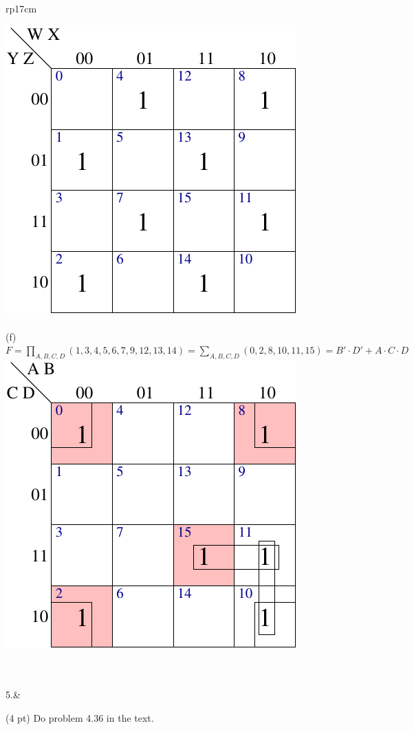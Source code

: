 \documentclass{article}
\begin{document}
\begin{longtable}[l]{rp{17cm}}
\begin{minipage}[t]{\linewidth}
\includegraphics{../CombinationalCircuits/Assessments/wakerly_4_15_e}\\ \\
(f)\\
$F=\prod_{A,B,C,D}(1,3,4,5,6,7,9,12,13,14)=\sum_{A,B,C,D}(0,2,8,10,11,15)=B' \cdot D' + A \cdot C \cdot D$\\
\includegraphics{../CombinationalCircuits/Assessments/wakerly_4_15_f}\\ \\
\end{minipage}\\
\medskip
5.&\begin{minipage}[t]{\linewidth}(4 pt) Do problem 4.36 in the text.\\ \\


\end{minipage}
\end{longtable}
\end{document}
